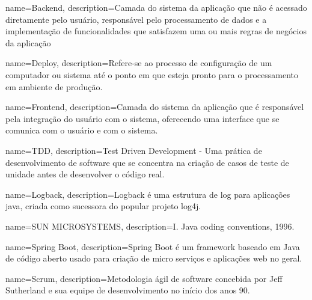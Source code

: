



 {
	name=Backend,
	description={Camada do sistema da aplicação que não é acessado diretamente pelo usuário, responsável pelo processamento de dados e a implementação de funcionalidades que satisfazem uma ou mais regras de negócios da aplicação}
}

 {
	name=Deploy,
	description={Refere-se ao processo de configuração de um computador ou sistema até o ponto em que esteja pronto para o processamento em ambiente de produção.}
}

 {
	name=Frontend,
	description={Camada do sistema da aplicação que é responsável pela integração do usuário com o sistema, oferecendo uma interface que se comunica com o usuário e com o sistema.}
}

 {
	name=TDD,
	description={Test Driven Development - Uma prática de desenvolvimento de software que se concentra na criação de casos de teste de unidade antes de desenvolver o código real.}
}

 {
	name=Logback,
	description={Logback é uma estrutura de log para aplicações java, criada como sucessora do popular projeto log4j.}
}

 {
	name=SUN MICROSYSTEMS,
	description={I. Java coding conventions, 1996.}
}

 {
	name=Spring Boot,
	description={Spring Boot é um framework baseado em Java de código aberto usado para criação de micro serviços e aplicações web no geral.}
}

 {
	name=Scrum,
	description={Metodologia ágil de software concebida por Jeff Sutherland e sua equipe de desenvolvimento no início dos anos 90.}
}


